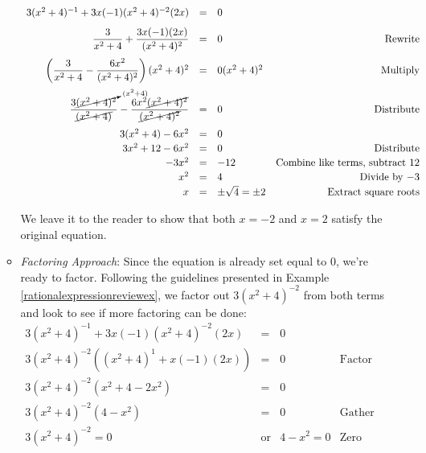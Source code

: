 \documentclass{ximera}
\begin{document}
\begin{example}
\begin{enumerate}
\begin{itemize}
\[\begin{array}{rclr}
3(x^2+4)^{-1} + 3x(-1)(x^2+4)^{-2}(2x)& = &  0 & \\ [8pt]

\dfrac{3}{x^2+4} + \dfrac{3x(-1)(2x)}{(x^2+4)^2} & = & 0 & \text{Rewrite} \\ [12pt]
\left(\dfrac{3}{x^2+4} - \dfrac{6x^2}{(x^2+4)^2} \right)(x^2+4)^2 & = & 0 (x^2+4)^2 & \text{Multiply} \\[12pt]

\dfrac{3\cancelto{(x^2+4)}{(x^2 + 4)^2}}{\cancel{(x^2+4)}}  - \dfrac{6x^2\cancel{(x^2+4)^2}}{\cancel{(x^2+4)^2}} & = & 0 & \text{Distribute} \\ [12pt]

3(x^2+4) - 6x^2 & = & 0 & \\ [2pt]

3x^2 + 12 - 6x^2 & = & 0 & \text{Distribute} \\ [2pt]

-3x^2 & = & -12 & \text{Combine like terms, subtract $12$} \\ [2pt]

x^2 & = & 4 & \text{Divide by $-3$} \\ [2pt]

x & = & \pm \sqrt{4} = \pm 2 & \text{Extract square roots} \\ 

\end{array} \]

We leave it to the reader to show that both $x = -2$ and $x = 2$ satisfy the original equation.

\item  \textit{Factoring Approach}:  Since the equation is already set equal to $0$, we're ready to factor. Following the guidelines presented in Example \ref{rationalexpressionreviewex}, we factor out $3(x^2+4)^{-2}$ from both terms and look to see if more factoring can be done:\[ \begin{array}{rclr}

3(x^2+4)^{-1} + 3x(-1)(x^2+4)^{-2}(2x)& = &  0 & \\ [2pt]

3(x^2+4)^{-2}( (x^2+4)^{1} + x(-1)(2x)) & = & 0 & \text{Factor} \\ [2pt]

3(x^2+4)^{-2}( x^2 + 4 - 2x^2 ) & = & 0 & \\ [2pt]

3(x^2+4)^{-2}(4 - x^2) & = & 0 & \text{Gather like terms} \\ [2pt]

3(x^2+4)^{-2} = 0 & \text{or} & 4 - x^2 = 0 & \text{Zero Product Property} \\ [2pt]


\end{array}\]
\end{itemize}
\end{enumerate}
\end{example}
\end{document}
